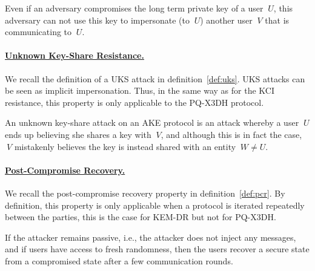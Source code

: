 \begin{definition}
\label{def:kci}
Even if an adversary compromises the long term private key of a user $\:U$, this adversary can not use this key to impersonate (to $\:U$) another user $\:V$ that is communicating to $\:U$.
\end{definition}

\paragraph{\underline{Unknown Key-Share Resistance.}} We recall the definition of a UKS attack in definition~\ref{def:uks}. UKS attacks can be seen as implicit impersonation. Thus, in the same way as for the KCI resistance, this property is only applicable to the PQ-X3DH protocol.

\begin{definition}
\label{def:uks}
An unknown key-share attack on an AKE protocol is an attack whereby a user $\:U$ ends up believing she shares a key with $\:V$, and although this is in fact the case, $\:V$ mistakenly believes the key is instead shared with an entity $\:W \neq U$.
\end{definition}

\paragraph{\underline{Post-Compromise Recovery.}} We recall the post-compromise recovery property in definition~\ref{def:pcr}. By definition, this property is only applicable when a protocol is iterated repeatedly between the parties, this is the case for KEM-DR but not for PQ-X3DH.

\begin{definition}
\label{def:pcr}
If the attacker remains passive, i.e.,
the attacker does not inject any messages, and if users have access to fresh randomness, then the users recover a secure state from a compromised state after a few communication rounds.
\end{definition}

